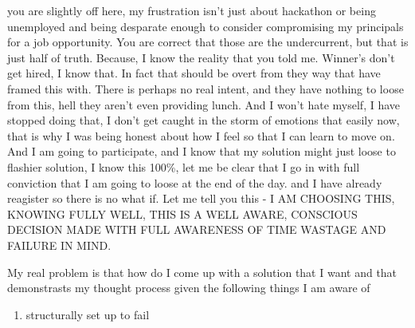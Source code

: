 \begin{userprompt}
you are slightly off here, my frustration isn't just about hackathon or being unemployed and being desparate enough to consider compromising my principals for a job opportunity. You are correct that those are the undercurrent, but that is just half of truth. Because, I know the reality that you told me. Winner's don't get hired, I know that. In fact that should be overt from they way that have framed this with. There is perhaps no real intent, and they have nothing to loose from this, hell they aren't even providing lunch. And I won't hate myself, I have stopped doing that, I don't get caught in the storm of emotions that easily now, that is why I was being honest about how I feel so that I can learn to move on. And I am going to participate, and I know that my solution might just loose to flashier solution, I know this 100\%, let me be clear that I go in with full conviction that I am going to loose at the end of the day. and I have already reagister so there is no what if. Let me tell you this - I AM CHOOSING THIS, KNOWING FULLY WELL, THIS IS A WELL AWARE, CONSCIOUS DECISION MADE WITH FULL AWARENESS OF TIME WASTAGE AND FAILURE IN MIND.

My real problem is that how do I come up with a solution that I want and that demonstrasts my thought process given the following things I am aware of

\begin{enumerate}
\item structurally set up to fail
\end{enumerate}
\end{userprompt}

